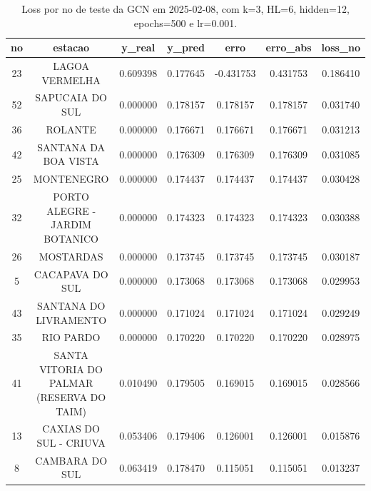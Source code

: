 \begin{table}[h]
\centering
\caption{Loss por no de teste da GCN em 2025-02-08, com k=3, HL=6, hidden=12, epochs=500 e lr=0.001.}
\label{tab:gcn_loss_k3_hl6_h12_e500_d20250208}
\begin{tabular}{ccccccc}
\toprule
no & estacao & y\_real & y\_pred & erro & erro\_abs & loss\_no \\
\midrule
23 & LAGOA VERMELHA & 0.609398 & 0.177645 & -0.431753 & 0.431753 & 0.186410 \\
52 & SAPUCAIA DO SUL & 0.000000 & 0.178157 & 0.178157 & 0.178157 & 0.031740 \\
36 & ROLANTE & 0.000000 & 0.176671 & 0.176671 & 0.176671 & 0.031213 \\
42 & SANTANA DA BOA VISTA & 0.000000 & 0.176309 & 0.176309 & 0.176309 & 0.031085 \\
25 & MONTENEGRO & 0.000000 & 0.174437 & 0.174437 & 0.174437 & 0.030428 \\
32 & PORTO ALEGRE - JARDIM BOTANICO & 0.000000 & 0.174323 & 0.174323 & 0.174323 & 0.030388 \\
26 & MOSTARDAS & 0.000000 & 0.173745 & 0.173745 & 0.173745 & 0.030187 \\
5 & CACAPAVA DO SUL & 0.000000 & 0.173068 & 0.173068 & 0.173068 & 0.029953 \\
43 & SANTANA DO LIVRAMENTO & 0.000000 & 0.171024 & 0.171024 & 0.171024 & 0.029249 \\
35 & RIO PARDO & 0.000000 & 0.170220 & 0.170220 & 0.170220 & 0.028975 \\
41 & SANTA VITORIA DO PALMAR (RESERVA DO TAIM) & 0.010490 & 0.179505 & 0.169015 & 0.169015 & 0.028566 \\
13 & CAXIAS DO SUL - CRIUVA & 0.053406 & 0.179406 & 0.126001 & 0.126001 & 0.015876 \\
8 & CAMBARA DO SUL & 0.063419 & 0.178470 & 0.115051 & 0.115051 & 0.013237 \\
\bottomrule
\end{tabular}
\end{table}
